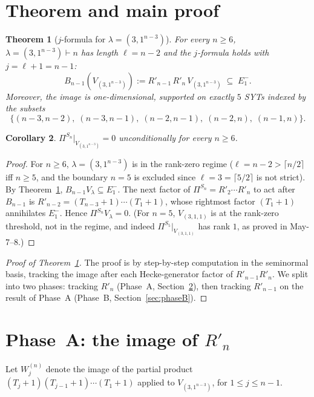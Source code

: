 \documentclass[11pt]{article}
\newtheorem{theorem}{Theorem}
\newtheorem{corollary}[theorem]{Corollary}
\theoremstyle{definition}
\begin{document}
\section{Theorem and main proof}

\begin{theorem}[$j$-formula for $\lambda=(3,1^{n-3})$]\label{thm:hook3}
For every $n\ge 6$, $\lambda=(3,1^{n-3})\vdash n$ has length
$\ell=n-2$ and the $j$-formula holds with $j=\ell+1=n-1$:
\[
   B_{n-1}(V_{(3,1^{n-3})}) := R'_{n-1}\,R'_n\,V_{(3,1^{n-3})}
   \;\subseteq\; E_1^-.
\]
Moreover, the image is one-dimensional, supported on exactly $5$ SYTs
indexed by the subsets
\[
   \{(n{-}3,n{-}2),\;(n{-}3,n{-}1),\;(n{-}2,n{-}1),\;(n{-}2,n),\;(n{-}1,n)\}.
\]
\end{theorem}

\begin{corollary}\label{cor:hook3-rank-zero}
$\Pi^{S_n}|_{V_{(3,1^{n-3})}}=0$ unconditionally for every $n\ge 6$.
\end{corollary}

\begin{proof}
For $n\ge 6$, $\lambda=(3,1^{n-3})$ is in the rank-zero regime
($\ell=n-2>\lceil n/2\rceil$ iff $n\ge 5$, and the boundary $n=5$ is
excluded since $\ell=3=\lceil 5/2\rceil$ is not strict).  By
Theorem~\ref{thm:hook3}, $B_{n-1}V_\lambda\subseteq E_1^-$.  The next
factor of $\Pi^{S_n}=R'_2\cdots R'_n$ to act after $B_{n-1}$ is
$R'_{n-2}=(T_{n-3}{+}1)\cdots(T_1{+}1)$, whose rightmost factor
$(T_1{+}1)$ annihilates $E_1^-$.  Hence $\Pi^{S_n}V_\lambda=0$.
(For $n=5$, $V_{(3,1,1)}$ is at the rank-zero threshold, not in the
regime, and indeed $\Pi^{S_5}|_{V_{(3,1,1)}}$ has rank $1$, as proved
in May-7--8.)
\end{proof}

\begin{proof}[Proof of Theorem~\ref{thm:hook3}]
The proof is by step-by-step computation in the seminormal basis,
tracking the image after each Hecke-generator factor of
$R'_{n-1}R'_n$.  We split into two phases: tracking $R'_n$ (Phase~A,
Section~\ref{sec:phaseA}), then tracking $R'_{n-1}$ on the result of
Phase~A (Phase~B, Section~\ref{sec:phaseB}).
\end{proof}

\section{Phase~A: the image of $R'_n$}\label{sec:phaseA}

Let $W_j^{(n)}$ denote the image of the partial product
$(T_j{+}1)(T_{j-1}{+}1)\cdots(T_1{+}1)$ applied to $V_{(3,1^{n-3})}$,
for $1\le j\le n-1$.
\end{document}
